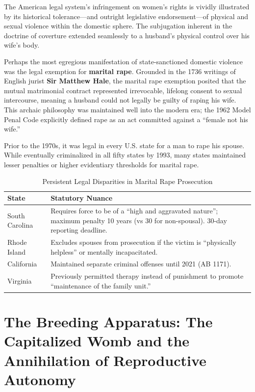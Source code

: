 \documentclass[12pt,openany]{book}
\begin{document}
The American legal system’s infringement on women's rights is vividly illustrated by its historical tolerance—and outright legislative endorsement—of physical and sexual violence within the domestic sphere. The subjugation inherent in the doctrine of coverture extended seamlessly to a husband’s physical control over his wife's body. 

Perhaps the most egregious manifestation of state-sanctioned domestic violence was the legal exemption for \textbf{marital rape}. Grounded in the 1736 writings of English jurist \textbf{Sir Matthew Hale}, the marital rape exemption posited that the mutual matrimonial contract represented irrevocable, lifelong consent to sexual intercourse, meaning a husband could not legally be guilty of raping his wife. This archaic philosophy was maintained well into the modern era; the 1962 Model Penal Code explicitly defined rape as an act committed against a ``female not his wife.''

Prior to the 1970s, it was legal in every U.S. state for a man to rape his spouse. While eventually criminalized in all fifty states by 1993, many states maintained lesser penalties or higher evidentiary thresholds for marital rape.

\begin{table}[htbp]
\centering
\small
\caption{Persistent Legal Disparities in Marital Rape Prosecution}
\label{tab:marital_rape}
\begin{tabular}{>{\raggedright}p{3cm} >{\raggedright\arraybackslash}p{9cm}}
\toprule
\textbf{State} & \textbf{Statutory Nuance} \\
\midrule
South Carolina & Requires force to be of a ``high and aggravated nature''; maximum penalty 10 years (vs 30 for non-spousal). 30-day reporting deadline. \\
Rhode Island & Excludes spouses from prosecution if the victim is ``physically helpless'' or mentally incapacitated. \\
California & Maintained separate criminal offenses until 2021 (AB 1171). \\
Virginia & Previously permitted therapy instead of punishment to promote ``maintenance of the family unit.'' \\
\bottomrule
\end{tabular}
\end{table}

\section{The Breeding Apparatus: The Capitalized Womb and the Annihilation of Reproductive Autonomy}
\end{document}
